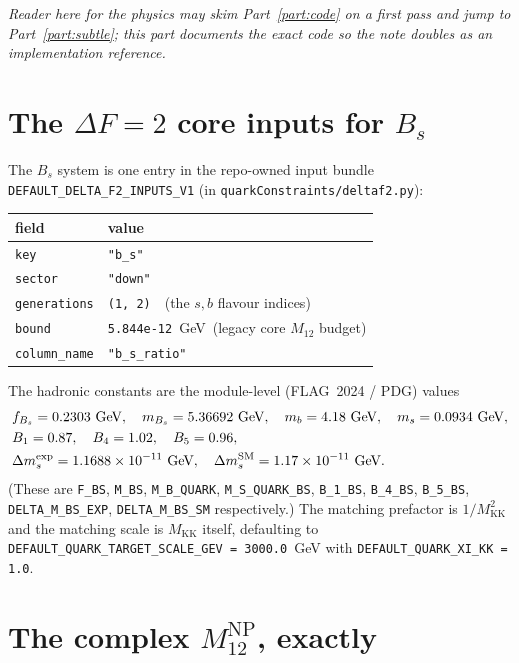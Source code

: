 \documentclass[11pt]{article}
\newcommand{\MKK}{M_{\mathrm{KK}}}
\newcommand{\code}[1]{\texttt{#1}}
\newcommand{\Bs}{B_s}
\newcommand{\dms}{\Delta m_s}
\newcommand{\MtwelveNP}{M_{12}^{\mathrm{NP}}}
\theoremstyle{definition}
\begin{document}
\emph{Reader here for the physics may skim Part~\ref{part:code} on a first pass
and jump to Part~\ref{part:subtle}; this part documents the exact code so the
note doubles as an implementation reference.}

\section{The $\Delta F=2$ core inputs for $\Bs$}
\label{sec:codeinputs}

The $\Bs$ system is one entry in the repo-owned input bundle
\code{DEFAULT\_DELTA\_F2\_INPUTS\_V1} (in \code{quarkConstraints/deltaf2.py}):
\begin{center}
\begin{tabular}{ll}
\toprule
field & value \\
\midrule
\code{key} & \code{"b\_s"} \\
\code{sector} & \code{"down"} \\
\code{generations} & \code{(1, 2)}\ \ (the $s,b$ flavour indices) \\
\code{bound} & \code{5.844e-12}\ GeV\ (legacy core $M_{12}$ budget) \\
\code{column\_name} & \code{"b\_s\_ratio"} \\
\bottomrule
\end{tabular}
\end{center}
The hadronic constants are the module-level (FLAG~2024 / PDG) values
\begin{equation}
\begin{aligned}
&f_{\Bs} = 0.2303~\text{GeV},\quad m_{\Bs}=5.36692~\text{GeV},\quad
m_b = 4.18~\text{GeV},\quad m_s = 0.0934~\text{GeV},\\
&B_1 = 0.87,\quad B_4 = 1.02,\quad B_5 = 0.96,\\
&\dms^{\rm exp} = 1.1688\times10^{-11}~\text{GeV},\quad
\dms^{\rm SM} = 1.17\times10^{-11}~\text{GeV}.
\end{aligned}
\end{equation}
(These are \code{F\_BS}, \code{M\_BS}, \code{M\_B\_QUARK},
\code{M\_S\_QUARK\_BS}, \code{B\_1\_BS}, \code{B\_4\_BS}, \code{B\_5\_BS},
\code{DELTA\_M\_BS\_EXP}, \code{DELTA\_M\_BS\_SM} respectively.) The matching
prefactor is $1/\MKK^2$ and the matching scale is $\MKK$ itself, defaulting to
\code{DEFAULT\_QUARK\_TARGET\_SCALE\_GEV = 3000.0}~GeV with
\code{DEFAULT\_QUARK\_XI\_KK = 1.0}.

\section{The complex $\MtwelveNP$, exactly}
\label{sec:codeM12}
\end{document}
